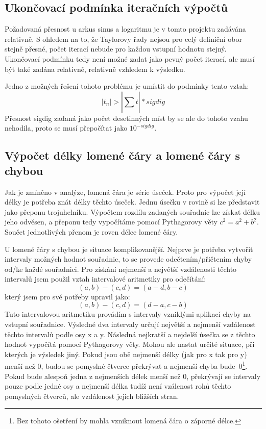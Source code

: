 \documentclass[12pt,a4paper,titlepage,final]{article}
\begin{document}
\subsection{Ukončovací podmínka iteračních výpočtů}\label{podminka}

Požadovaná přesnost u arkus sinus a logaritmu je v tomto projektu zadávána
relativně. S ohledem na to, že Taylorovy řady nejsou pro celý definiční obor
stejně přesné, počet iterací nebude pro každou vstupní hodnotu stejný.
Ukončovací podmínku tedy není možné zadat jako pevný počet iterací, ale musí
být také zadána relativně, relativně vzhledem k výsledku.

Jedno z možných řešení tohoto problému je umístit do podmínky tento vztah:
\begin{equation}\label{eq:podminka}
|t_{n}|>|\sum_{}^{}t|*sigdig
\end{equation}
Přesnost sigdig zadaná jako počet desetinných míst by se ale do tohoto vzahu
nehodila, proto se musí přepočítat jako $10^{-sigdig}$.

\subsection{Výpočet délky lomené čáry a lomené čáry s chybou}

Jak je zmíněno v analýze, lomená čára je série úseček. Proto pro výpočet její
délky je potřeba znát délky těchto úseček. Jednu úsečku v rovině si lze
představit jako přeponu trojuhelníku.
Výpočtem rozdílu zadaných souřadnic lze získat délku jeho odvěsen, a přeponu 
tedy vypočítáme pomocí Pythagorovy věty $c^2=a^2+b^2$. Součet jednotlivých
přenom je roven délce lomené čáry.

U lomené čáry s chybou je situace komplikovanější. Nejprve je potřeba vytvořit
intervaly možných hodnot souřadnic, to se provede odečtením/přičtením chyby
od/ke každé souřadnici. Pro získání nejmenší
a největší vzdálenosti těchto intervalů jsem použil vztah intervalové
aritmetiky pro odečítání:
\begin{equation}\label{eq:inetvalova_aritmetika}
(a,b)-(c,d)=(a-d,b-c)
\end{equation}
který jsem pro své potřeby upravil jako:
\begin{equation}\label{eq:inetvalova_aritmetika}
(a,b)-(c,d)=(d-a,c-b)
\end{equation}
Tuto intervalovou aritmetiku provádím s intervaly vzniklými aplikací chyby
na vstupní souřadnice. Výsledné dva intervaly určují největší a nejmenší
vzdálenost těchto intervalů podle osy x a y. Následná nejkratší a nejdelší
úsečka se z těchto hodnot vypočítá pomocí Pythagorovy věty. Mohou ale nastat
určité situace, při kterých je výsledek jiný. Pokud jsou obě nejmenší délky
(jak pro x tak pro y) menší než 0, budou se pomyslné čtverce překrývat a
nejmenší chyba bude~0\footnote{Bez tohoto ošetření by mohla vzniknout lomená
čára o záporné délce.}. Pokud bude alespoň jedna z nejmenších délek menší než 0,
překrývají se intervaly pouze podle jedné osy a nejmenší délka tudíž není
vzálenost rohů těchto pomyslných čtverců, ale vzdálenost jejich bližších stran.
\end{document}
